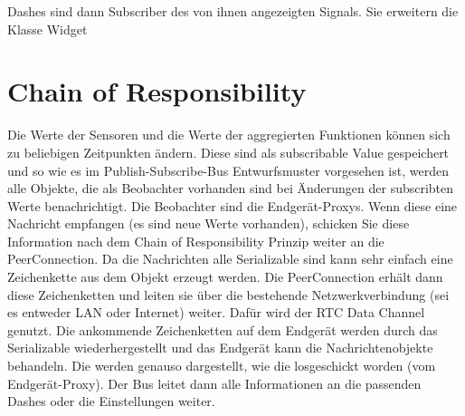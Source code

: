\documentclass[entwurf.tex]{subfiles}
\begin{document}
Dashes sind dann Subscriber des von ihnen angezeigten Signals. Sie erweitern die Klasse Widget

\section{Chain of Responsibility}

Die Werte der Sensoren und die Werte der aggregierten Funktionen können sich zu beliebigen Zeitpunkten ändern. Diese sind als subscribable Value gespeichert und so wie es im Publish-Subscribe-Bus Entwurfsmuster vorgesehen ist, werden alle Objekte, die als Beobachter vorhanden sind bei Änderungen der subscribten Werte benachrichtigt. Die Beobachter sind die Endgerät-Proxys. Wenn diese eine Nachricht empfangen (es sind neue Werte vorhanden), schicken Sie diese Information nach dem Chain of Responsibility Prinzip weiter an die PeerConnection. Da die Nachrichten alle Serializable sind kann sehr einfach eine Zeichenkette aus dem Objekt erzeugt werden. Die PeerConnection erhält dann diese Zeichenketten und leiten sie über die bestehende Netzwerkverbindung (sei es entweder LAN oder Internet) weiter. Dafür wird der RTC Data Channel genutzt. Die ankommende Zeichenketten auf dem Endgerät werden durch das Serializable wiederhergestellt und das Endgerät kann die Nachrichtenobjekte behandeln. Die werden genauso dargestellt, wie die losgeschickt worden (vom Endgerät-Proxy). Der Bus leitet dann alle Informationen an die passenden Dashes oder die Einstellungen weiter.
\end{document}

